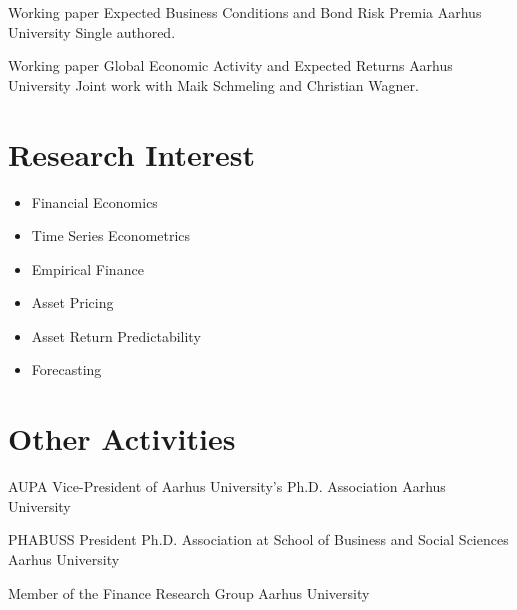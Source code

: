 \documentclass[11pt,a4paper,sans]{moderncv}
\begin{document}
        {Working paper}
        {Expected Business Conditions and Bond Risk Premia}
        {Aarhus University}
        {}
        {Single authored.}

        {Working paper}
        {Global Economic Activity and Expected Returns}
        {Aarhus University}
        {}
        {Joint work with Maik Schmeling and Christian Wagner.}


\section{Research Interest}

\begin{multicols}{2}
    \begin{itemize}
        \item Financial Economics
        \item Time Series Econometrics
        \item Empirical Finance
        \item Asset Pricing
        \item Asset Return Predictability
        \item Forecasting
    \end{itemize}
\end{multicols}


\section{Other Activities}

        {AUPA}
        {Vice-President of Aarhus University's Ph.D. Association}
        {Aarhus University}
        {}
        {}

        {PHABUSS}
        {President Ph.D. Association at School of Business and Social Sciences}
        {Aarhus University}
        {}
        {}

        {}
        {Member of the Finance Research Group}
        {Aarhus University}
        {}
        {}
\end{document}
